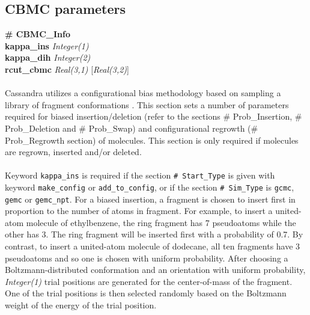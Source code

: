 \subsection{CBMC parameters}\label{sec:CBMC_Info}
{\bf \# CBMC\_Info} \\
{\bf kappa\_ins} {\it Integer(1)} \\
{\bf kappa\_dih} {\it Integer(2)} \\
{\bf rcut\_cbmc} {\it Real(3,1)} [{\it Real(3,2)}] \\ \\
%
Cassandra utilizes a configurational bias methodology based on sampling a library of fragment conformations \cite{Shah:2011}.
This section sets a number of parameters required for biased insertion/deletion (refer to the sections
\# Prob\_Insertion, \# Prob\_Deletion and \# Prob\_Swap) and configurational
regrowth (\# Prob\_Regrowth section) of molecules. 
This section is only required if molecules are regrown, inserted and/or deleted. \\ \\
%
Keyword {\tt kappa\_ins} is required
if the section {\tt \# Start\_Type} is given with keyword {\tt make\_config} or {\tt add\_to\_config}, or
if the section {\tt \# Sim\_Type} is {\tt gcmc}, {\tt gemc} or {\tt gemc\_npt}.
For a biased insertion, a fragment is chosen to insert first in proportion to the number of atoms in fragment.
For example, to insert a united-atom molecule of ethylbenzene, 
the ring fragment has 7 pseudoatoms while the other has 3.
The ring fragment will be inserted first with a probability of 0.7.
By contrast, to insert a united-atom molecule of dodecane, 
all ten fragments have 3 pseudoatoms and so one is chosen with uniform probability.
After choosing a Boltzmann-distributed conformation and an orientation with uniform probability,
{\it Integer(1)} trial positions are generated for the center-of-mass of the fragment.
One of the trial positions is then selected randomly based on the Boltzmann weight of the energy of the trial position. \\ \\
%
